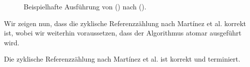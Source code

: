 \begin{figure}[h]
	\centering
	\begin{subfigure}{0.4\textwidth}
		\centering
		
	\end{subfigure}~\hspace{0.5cm}~
	\begin{subfigure}{0.4\textwidth}
		\centering
		
	\end{subfigure}\\[1cm]
	\begin{subfigure}{0.4\textwidth}
		\centering
		
	\end{subfigure}~\hspace{0.5cm}~
	\begin{subfigure}{0.4\textwidth}
		\centering
		
	\end{subfigure}\\[1cm]
	\begin{subfigure}{0.4\textwidth}
		\centering
		
	\end{subfigure}~\hspace{0.5cm}~
	\begin{subfigure}{0.4\textwidth}
		\centering
		
	\end{subfigure}
	\caption[Ausführung von ()]{Beispielhafte Ausführung von () nach ().}
	\label{fig:rc-unmark-example}
\end{figure}

Wir zeigen nun, dass die zyklische Referenzzählung nach Martínez et al. korrekt ist, wobei wir weiterhin voraussetzen, dass der Algorithmus atomar ausgeführt wird.

\begin{mybox}
\begin{satz}
\label{satz:cyclic-rc-correctness}
	Die zyklische Referenzzählung nach Martínez et al. ist korrekt und terminiert.
\end{satz}
\end{mybox}

